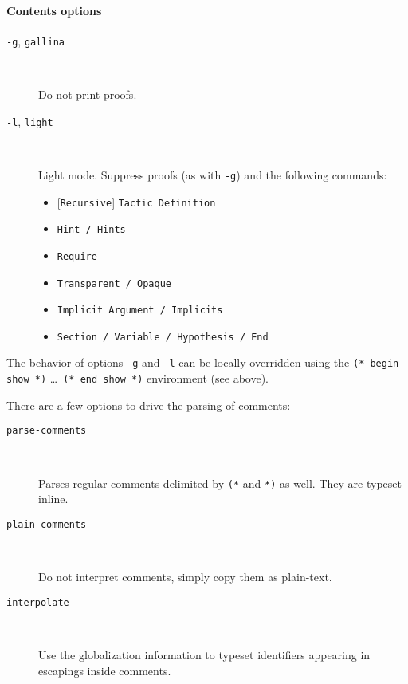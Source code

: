 \paragraph{Contents options}
\begin{description}

\item[\texttt{-g}, \texttt{\mm{}gallina}] ~\par

  Do not print proofs.

\item[\texttt{-l}, \texttt{\mm{}light}] ~\par
  
  Light mode. Suppress proofs (as with \texttt{-g}) and the following commands:
  \begin{itemize}
  \item {}[\texttt{Recursive}] \texttt{Tactic Definition}
  \item \texttt{Hint / Hints} 
  \item \texttt{Require}
  \item \texttt{Transparent / Opaque}
  \item \texttt{Implicit Argument / Implicits}
  \item \texttt{Section / Variable / Hypothesis / End}
  \end{itemize}

\end{description}
The behavior of options \texttt{-g} and \texttt{-l} can be locally
overridden using the \texttt{(* begin show *)} \dots\ \texttt{(* end
  show *)} environment (see above).

There are a few options to drive the parsing of comments:
\begin{description}
\item[\texttt{\mm{}parse-comments}] ~\par

  Parses regular comments delimited by \texttt{(*} and \texttt{*)} as 
  well. They are typeset inline.

\item[\texttt{\mm{}plain-comments}] ~\par

  Do not interpret comments, simply copy them as plain-text.

\item[\texttt{\mm{}interpolate}] ~\par

  Use the globalization information to typeset identifiers appearing in
  \Coq{} escapings inside comments.
\end{description}


